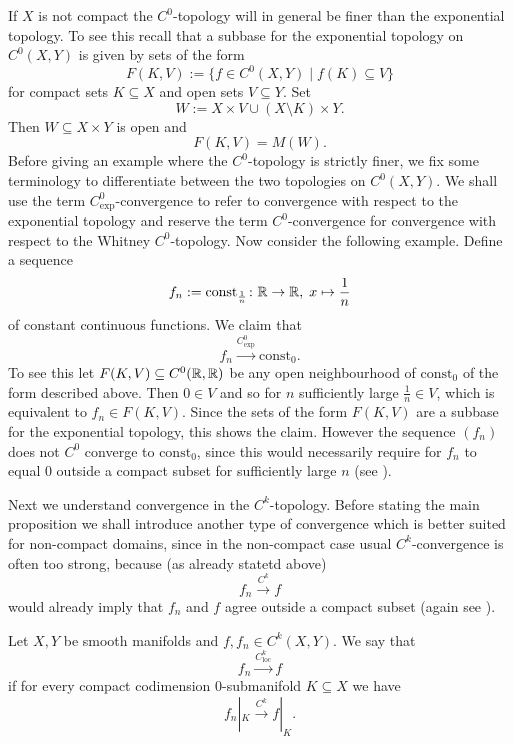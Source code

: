 \begin{remark}
    If $X$ is not compact the $C^0$-topology will in general be finer than the exponential topology. To see this recall that a subbase for the exponential topology on $C^0(X,Y)$ is given by sets of the form
    \[
    F(K,V) := \{f \in C^0(X,Y) \mid f(K) \subseteq V\}
    \]
    for compact sets $K \subseteq X$ and open sets $V \subseteq Y$. Set 
    \[
    W := X \times V \cup (X\setminus K) \times Y.
    \]
    Then $W \subseteq X \times Y$ is open and 
    \[
    F(K,V) = M(W).
    \]
    Before giving an example where the $C^0$-topology is strictly finer, we fix some terminology to differentiate between the two topologies on $C^0(X,Y)$. We shall use the term $C^0_\mathrm{exp}$-convergence to refer to convergence with respect to the exponential topology and reserve the term $C^0$-convergence for convergence with respect to the Whitney $C^0$-topology. Now consider the following example. Define a sequence 
    \[
    f_n := \mathrm{const}_{\frac{1}{n}}  \colon \mathbb{R} \to \mathbb{R}, \; x \mapsto \frac{1}{n}
    \]
    of constant continuous functions. We claim that 
    \[
    f_n \xrightarrow{C^0_\mathrm{exp}} \mathrm{const}_0.
    \]
    To see this let $F(K,V) \subseteq C^0(\mathbb{R},\mathbb{R})$ be any open neighbourhood of $\mathrm{const}_0$ of the form described above. Then $0 \in V$ and so for $n$ sufficiently large $\frac{1}{n} \in V$, which is equivalent to $f_n \in F(K,V)$. Since the sets of the form $F(K,V)$ are a subbase for the exponential topology, this shows the claim. However the sequence $(f_n)$ does not $C^0$ converge to $\mathrm{const}_0$, since this would necessarily require for $f_n$ to equal $0$ outside a compact subset for sufficiently large $n$ (see \cite{golubitsky2012stable}).
\end{remark}

Next we understand convergence in the $C^k$-topology. Before stating the main proposition we shall introduce another type of convergence which is better suited for non-compact domains, since in the non-compact case usual $C^k$-convergence is often too strong, because (as already statetd above) 
\[
f_n \xrightarrow{C^k} f
\]
would already imply that $f_n$ and $f$ agree outside a compact subset (again see \cite{golubitsky2012stable}).

\begin{definition}
    Let $X,Y$ be smooth manifolds and $f,f_n \in C^k(X,Y)$. We say that 
    \[
    f_n \xrightarrow{C^k_{\mathrm{loc}}} f
    \]
    if for every compact codimension $0$-submanifold $K \subseteq X$ we have 
    \[
    f_n|_K \xrightarrow{C^k} f|_K.
    \]
\end{definition}

